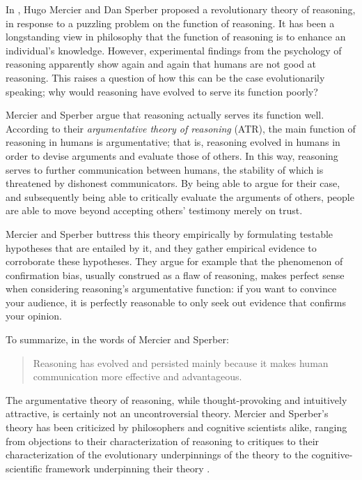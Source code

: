 
In \citeyear{MS11}, Hugo Mercier and Dan Sperber proposed a revolutionary
theory of reasoning, in response to a puzzling problem on the function of reasoning.
It has been a longstanding view in philosophy that the function of reasoning is to enhance an individual's knowledge. However, experimental findings from the psychology of reasoning apparently show again and again that humans are not good at reasoning. This raises a question of how this can be the case evolutionarily speaking; why would reasoning have evolved to serve its function poorly?

Mercier and Sperber argue that reasoning actually serves its function well.
According to their \emph{argumentative theory of reasoning} (ATR), the main function of reasoning in humans is argumentative; that is, reasoning evolved in humans in order to devise arguments and evaluate those of others. In this way, reasoning serves to further communication between humans, the stability of which is threatened by dishonest communicators. By being able to argue for their case, and subsequently being able to critically evaluate the arguments of others, people are able to move beyond accepting others' testimony merely on trust.

Mercier and Sperber buttress this theory empirically by formulating testable hypotheses that are entailed by it, and they gather empirical evidence to corroborate these hypotheses. They argue for example that the phenomenon of confirmation bias, usually construed as a flaw of reasoning, makes perfect sense when considering reasoning's argumentative function: if you want to convince your audience, it is perfectly reasonable to only seek out evidence that confirms your opinion.

To summarize, in the words of Mercier and Sperber:
\begin{quote}
    Reasoning has evolved and persisted mainly because it makes human communication more effective and advantageous.
    \citep[p.~60]{MS11}
\end{quote}

The argumentative theory of reasoning, while thought-provoking and intuitively attractive, is certainly not an uncontroversial theory. Mercier and Sperber's theory has been criticized by philosophers and cognitive scientists alike, ranging from objections to their characterization of reasoning \citep{Koren23} to critiques to their characterization of the evolutionary underpinnings of the theory \citep{Dutilh18} to the cognitive-scientific framework underpinning their theory \citep{Sterelny18, Chater18}.

